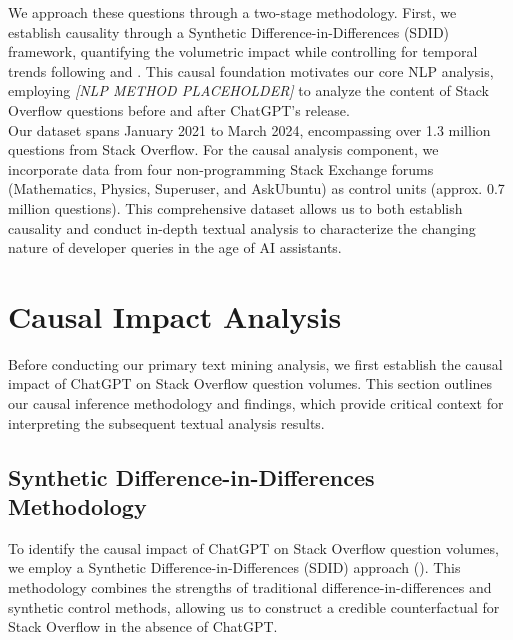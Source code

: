 We approach these questions through a two-stage methodology. First, we establish causality through a Synthetic Difference-in-Differences (SDID) framework, quantifying the volumetric impact while controlling for temporal trends following \textcite{arkhangelsky_synthetic_2021} and \textcite{clarke_synthetic_2023}. This causal foundation motivates our core NLP analysis, employing \textit{[NLP METHOD PLACEHOLDER]} to analyze the content of Stack Overflow questions before and after ChatGPT's release.\\

Our dataset spans January 2021 to March 2024, encompassing over 1.3 million questions from Stack Overflow. For the causal analysis component, we incorporate data from four non-programming Stack Exchange forums (Mathematics, Physics, Superuser, and AskUbuntu) as control units (approx. 0.7 million questions). This comprehensive dataset allows us to both establish causality and conduct in-depth textual analysis to characterize the changing nature of developer queries in the age of AI assistants.


\section{Causal Impact Analysis}
Before conducting our primary text mining analysis, we first establish the causal impact of ChatGPT on Stack Overflow question volumes. This section outlines our causal inference methodology and findings, which provide critical context for interpreting the subsequent textual analysis results.

\subsection{Synthetic Difference-in-Differences Methodology}
To identify the causal impact of ChatGPT on Stack Overflow question volumes, we employ a Synthetic Difference-in-Differences (SDID) approach (\cite{arkhangelsky_synthetic_2021}). This methodology combines the strengths of traditional difference-in-differences and synthetic control methods, allowing us to construct a credible counterfactual for Stack Overflow in the absence of ChatGPT.\\

